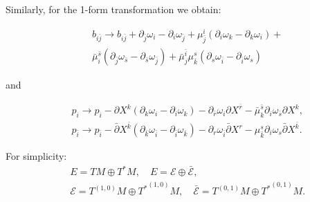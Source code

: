 \documentclass[9pt]{beamer}
\def\b{\bar}
\newcommand{\p}{\partial}
\def\b{\bar}
\begin{document}

\begin{frame}
Similarly, for the 1-form transformation we obtain:

\begin{eqnarray*}
&&b_{i\bar{j}}\to  b_{i\bar{j}}+\p_{\bar j}\omega_i-\p_i\omega_{\bar j}+\mu^i_{\bar j}(\p_i\omega_k-\p_k\omega_i)+\nonumber\\
&&\bar{\mu}^{\bar s} _i(\p_{\bar j}\omega_{\bar s}-
\p_{\bar s}\omega_{\bar j})+
{\bar \mu}^{\bar i}_j\mu_{\bar k}^s(\p_s\omega_{\bar i}-\p_{\bar i}\omega_s)
\end{eqnarray*}

and

\begin{eqnarray*}
&& p_i\to p_i-\p X^k(\p_k\omega_i-\p_i\omega_k)-\p_{\b r}\omega_i\p X^{\bar r}-{\bar \mu}^{\bar s}_k\p_i\omega_{\bar s}\p X^k, \nonumber\\
&& p_{\b i}\to p_{\b i}-{\bar\p} X^{\b k}(\p_{\b k}\omega_{\b i}-{\p}_{\b i}\omega_{\b k})-\p_{r}\omega_{\bar i}{\bar\p} X^{r}-{\mu}^{s}_{\bar k}\p_i\omega_{s}{\bar\p} X^{\bar k}.
\end{eqnarray*}

\vspace*{5mm}

For simplicity:  
\begin{eqnarray*}
&&E=TM\oplus T^*M,  \quad E=\mathcal{E}\oplus\bar{\mathcal{E}},\\
&&\mathcal{E}=T^{(1,0)}M\oplus {T^*}^{(1,0)}M, \quad \bar{\mathcal{E}}=T^{(0,1)}M\oplus {T^*}^{(0,1)}M.
\end{eqnarray*}



\end{frame}
\end{document}
